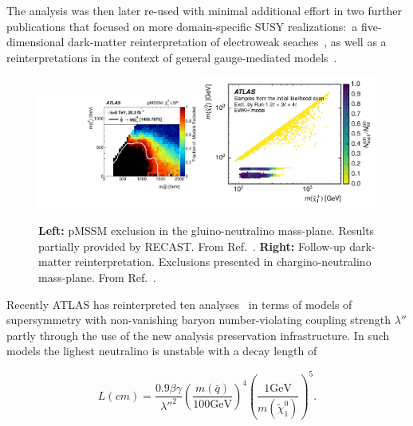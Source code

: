 The analysis was then later re-used with minimal additional effort in two further publications that focused on more domain-specific SUSY realizations:~a five-dimensional dark-matter reinterpretation of electroweak seaches~\cite{Aaboud:2016wna}, as well as a reinterpretations in the context of general gauge-mediated models~\cite{ATLAS-CONF-2016-033}.

\begin{figure}[t]
\begin{center}
\includegraphics[width=0.48\textwidth,angle=0]{ch5-figures/pMSSM.pdf}\includegraphics[width=0.52\textwidth,angle=0]{ch5-figures/DM.pdf}

\end{center}
\caption{
{\bf Left:} pMSSM exclusion in the gluino-neutralino mass-plane. Results partially provided by RECAST. From Ref.~\cite{Aad:2015baa}.
{\bf Right:} Follow-up dark-matter reinterpretation. Exclusions presented in chargino-neutralino mass-plane. From Ref.~\cite{Aaboud:2016wna}.
}
\label{fig:recast-cc}
\end{figure}

Recently ATLAS has reinterpreted ten analyses~\cite{ATLAS-CONF-2018-003} in terms of models of supersymmetry with non-vanishing baryon number-violating coupling strength $\lambda''$ partly through the use of the new analysis preservation infrastructure. In such models the lighest neutralino is unstable with a decay length of

\begin{equation}
  L(cm) = \frac{0.9\beta\gamma}{{\lambda''}^2} \left(\frac{m(\bar{q})}{100\mathrm{GeV}}\right)^4\left(\frac{1\mathrm{GeV}}{m(\tilde{\chi}_1^0)}\right)^5.
\end{equation}

